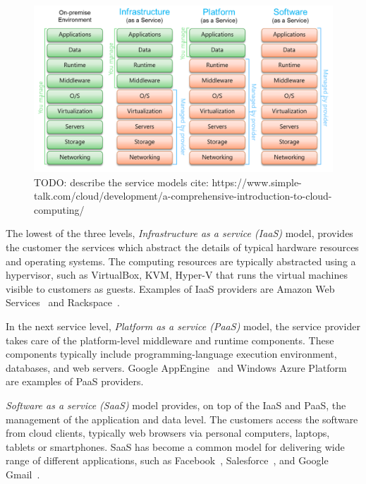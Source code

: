 \begin{figure}[]
  \begin{center}
    \includegraphics[width=\textwidth]{images/cloud-computing-service-models.png}
    \caption{TODO: describe the service models cite: https://www.simple-talk.com/cloud/development/a-comprehensive-introduction-to-cloud-computing/}
    \label{fig:cloud-computing-service-models}
  \end{center}
\end{figure}

The lowest of the three levels, \emph{Infrastructure as a service (IaaS)} model, provides the customer the services which abstract the details of typical hardware resources and operating systems. The computing resources are typically abstracted using a hypervisor, such as VirtualBox, KVM, Hyper-V that runs the virtual machines visible to customers as guests. Examples of IaaS providers are Amazon Web Services~\cite{Murty:2008:AWS} and Rackspace~\cite{Rackspace:2010:Inc}.~\cite{Mell:2011:ccdef}

In the next service level, \emph{Platform as a service (PaaS)} model, the service provider takes care of the platform-level middleware and runtime components. These components typically include programming-language execution environment, databases, and web servers. Google AppEngine~\cite{Sanderson:2009:GoogleAppEngine} and Windows Azure Platform~\cite{Redkar:2011:Azure} are examples of PaaS providers.~\cite{Mell:2011:ccdef}

\emph{Software as a service (SaaS)} model provides, on top of the IaaS and PaaS, the management of the application and data level. The customers access the software from cloud clients, typically web browsers via personal computers, laptops, tablets or smartphones. SaaS has become a common model for delivering wide range of different applications, such as Facebook~\cite{facebook}, Salesforce~\cite{salesforce}, and Google Gmail~\cite{Teeter:2011:Gmail}.~\cite{Mell:2011:ccdef}

